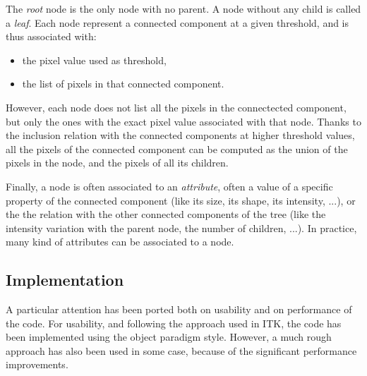\documentclass{InsightArticle}
\begin{document}
The {\em root} node is the only node with no parent. A node without any child is called a {\em leaf}.
Each node represent a connected component at a given threshold, and is thus associated with:
\begin{itemize}
  \item the pixel value used as threshold,
  \item the list of pixels in that connected component.
\end{itemize}

However, each node does not list all the pixels in the connectected component, but only the ones with the exact pixel value associated with that node. Thanks to the inclusion relation with the connected components at higher threshold values, all the pixels of the connected component can be computed as the union of the pixels in the node, and the pixels of all its children.

Finally, a node is often associated to an {\em attribute}, often a value of a specific property of the connected component (like its size, its shape, its intensity, ...), or the the relation with the other connected components of the tree (like the intensity variation with the parent node, the number of children, ...). In practice, many kind of attributes can be associated to a node.

  \subsection{Implementation}

A particular attention has been ported both on usability and on performance of the code.
For usability, and following the approach used in ITK, the code has been implemented using the object paradigm style. However, a much rough approach has also been used in some case, because of the significant performance improvements.
\end{document}
